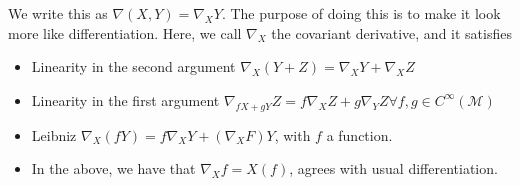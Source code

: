 \documentclass[11pt, a4paper]{article}   	%
\theoremstyle{slplain}
\begin{document}
We write this as $ \nabla  ( X, Y )  = \nabla _{ X } Y $. 
The purpose of doing this is to make it look more like differentiation. 
Here, we call $ \nabla  _ X $ the covariant derivative, and it satisfies 
\begin{itemize}
	\item Linearity in the second argument $ \nabla _ X ( Y + Z )  = \nabla _ X Y + \nabla _ X Z $
	\item Linearity in the first argument $ \nabla _{ f X + g Y }  Z = f \nabla _ X Z + g \nabla _ Y Z \forall f, g \in C^\infty ( \mathcal{ M } ) $
	\item Leibniz $ \nabla _ X ( f Y )  = f \nabla _ X Y + ( \nabla _ X F ) Y $, with $ f $ a function. 
	\item In the above, we have that $ \nabla _ X f = X ( f ) $, agrees with usual differentiation. 
\end{itemize} 
\end{document}
